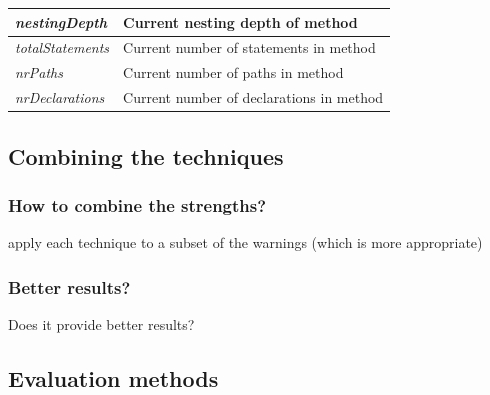 \begin{table}[H]
\begin{tabular}{@{}ll@{}}
		\textit{nestingDepth}         & Current nesting depth of method                                                                                                        \\ \midrule
		\textit{totalStatements}      & Current number of statements in method                                                                                                 \\ \midrule
		\textit{nrPaths}              & Current number of paths in method                                                                                                      \\ \midrule
		\textit{nrDeclarations}       & Current number of declarations in method                            \\\midrule 
	\end{tabular}
\end{table}


\subsection{Combining the techniques}

\subsubsection{How to combine the strengths?}
apply each technique to a subset of the warnings (which is more appropriate)

\subsubsection{Better results?}
Does it provide better results?


\subsection{Evaluation methods}

